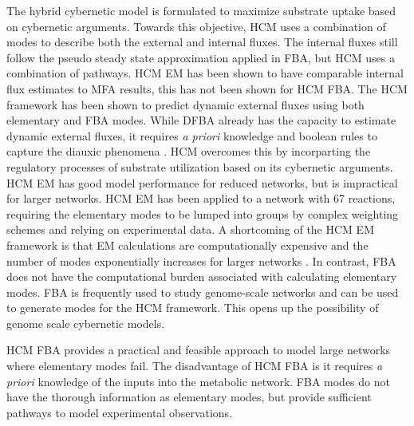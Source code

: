 \documentclass[10pt,twocolumn,twoside,final]{IEEEtran}
\begin{document}
The hybrid cybernetic model is formulated to maximize substrate uptake based on cybernetic arguments.
Towards this objective, HCM uses a combination of modes to describe both the external and internal fluxes.
The internal fluxes still follow the pseudo steady state approximation applied in FBA, but HCM uses a combination of pathways.
HCM EM has been shown to have comparable internal flux estimates to MFA results\cite{2008_kim_varner_ramkrishna_BiotechProg}, this has not been shown for HCM FBA.
The HCM framework has been shown to predict dynamic external fluxes using both elementary and FBA modes.
While DFBA already has the capacity to estimate dynamic external fluxes, it requires \textit{a priori} knowledge and boolean rules to capture the diauxic phenomena \cite{1994_varma_palsson_ApplEnvMicro,2002_Mahadevan_BiophysJ,2001_covert_schilling_palsson}.
HCM overcomes this by incorparting the regulatory processes of substrate utilization based on its cybernetic arguments.
HCM EM has good model performance for reduced networks, but is impractical for larger networks.
HCM EM has been applied to a network with 67 reactions, requiring the elementary modes to be lumped into groups by complex weighting schemes and relying on experimental data\cite{2010_song_ramkrishna}.
A shortcoming of the HCM EM framework is that EM calculations are computationally expensive and the number of modes exponentially increases for larger networks \cite{2004_lee_varner_ko_ieee}.
In contrast, FBA does not have the computational burden associated with calculating elementary modes.
FBA is frequently used to study genome-scale networks\cite{2010_orth_NatBiotech} and can be used to generate modes for the HCM framework.
This opens up the possibility of genome scale cybernetic models.

HCM FBA provides a practical and feasible approach to model large networks where elementary modes fail.
The disadvantage of HCM FBA is it requires \textit{a priori} knowledge of the inputs into the metabolic network.
FBA modes do not have the thorough information as elementary modes, but provide sufficient pathways to model experimental observations.
\end{document}
